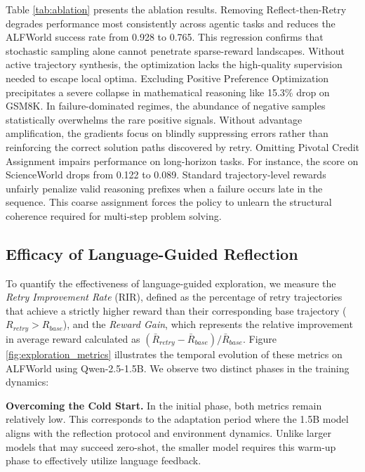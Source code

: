 \documentclass[11pt]{article}
\begin{document}


Table \ref{tab:ablation} presents the ablation results. Removing Reflect-then-Retry degrades performance most consistently across agentic tasks and reduces the ALFWorld success rate from 0.928 to 0.765. This regression confirms that stochastic sampling alone cannot penetrate sparse-reward landscapes. Without active trajectory synthesis, the optimization lacks the high-quality supervision needed to escape local optima. Excluding Positive Preference Optimization precipitates a severe collapse in mathematical reasoning like 15.3\% drop on GSM8K. In failure-dominated regimes, the abundance of negative samples statistically overwhelms the rare positive signals. Without advantage amplification, the gradients focus on blindly suppressing errors rather than reinforcing the correct solution paths discovered by retry. Omitting Pivotal Credit Assignment impairs performance on long-horizon tasks. For instance, the score on ScienceWorld drops from 0.122 to 0.089. Standard trajectory-level rewards unfairly penalize valid reasoning prefixes when a failure occurs late in the sequence. This coarse assignment forces the policy to unlearn the structural coherence required for multi-step problem solving.

\subsection{Efficacy of Language-Guided Reflection}
\label{sec:reflect_efficacy}



To quantify the effectiveness of language-guided exploration, we measure the \textit{Retry Improvement Rate} (RIR), defined as the percentage of retry trajectories that achieve a strictly higher reward than their corresponding base trajectory ($R_{retry} > R_{base}$), and the \textit{Reward Gain}, which represents the relative improvement in average reward calculated as $(\bar{R}_{retry} - \bar{R}_{base}) / \bar{R}_{base}$. Figure \ref{fig:exploration_metrics} illustrates the temporal evolution of these metrics on ALFWorld using Qwen-2.5-1.5B. We observe two distinct phases in the training dynamics:

\textbf{Overcoming the Cold Start.} In the initial phase, both metrics remain relatively low. This corresponds to the adaptation period where the 1.5B model aligns with the reflection protocol and environment dynamics. Unlike larger models that may succeed zero-shot, the smaller model requires this warm-up phase to effectively utilize language feedback.
\end{document}
